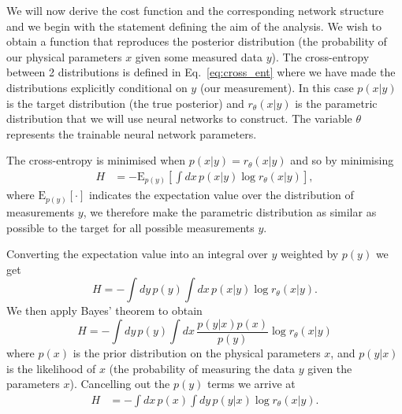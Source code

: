 %
%
We will now derive the cost function and the corresponding network structure and 
we begin with the statement defining the aim of the analysis. We wish to obtain a 
function that reproduces the posterior distribution (the probability of our 
physical parameters $x$ given some measured data $y$). The cross-entropy between 
2 distributions is defined in Eq.~\ref{eq:cross_ent} where we have made the 
distributions explicitly conditional on $y$ (our measurement). In this case 
$p(x|y)$ is the target distribution (the true posterior) and $r_{\theta}(x|y)$ is the 
parametric distribution that we will use neural networks 
to construct. The variable $\theta$ represents the trainable neural network parameters. 

%
%
The cross-entropy is minimised when $p(x|y)=r_{\theta}(x|y)$ and so by minimising
%
\begin{align}\label{eq:cost1}
H &= -\text{E}_{p(y)}\left[\int dx\,p(x|y) \log r_{\theta}(x|y)\right],
\end{align}
% 
where $\text{E}_{p(y)}[\cdot]$ indicates the expectation value over the 
distribution of measurements $y$, we therefore make the parametric distribution as 
similar as possible to the target for all possible measurements $y$.

%
%
Converting the expectation value into an integral over $y$ weighted by $p(y)$ we get 
%
\begin{equation}
    H = -\int dy\,p(y) \int dx\,p(x|y) \log r_{\theta}(x|y).
\end{equation}
%
We then apply Bayes' theorem to obtain
\begin{equation}
    H = -\int dy\,p(y) \int dx\, \frac{p(y|x)p(x)}{p(y)} \log r_{\theta}(x|y)
\end{equation}
%
where $p(x)$ is the prior distribution on the physical parameters $x$, and $p(y|x)$ is the likelihood of $x$ (the probability of measuring the data $y$ given the parameters $x$).
Cancelling out the $p(y)$ terms we arrive at
%
\begin{align}\label{eq:cost1}
H &= -\int dx\,p(x)\int dy\,p(y|x)\log r_{\theta}(x|y).
\end{align}
%

